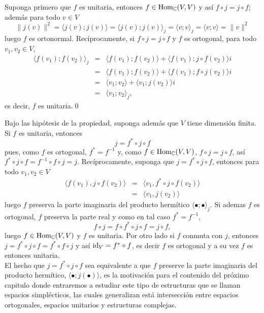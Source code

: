 \dem Suponga primero que $f$ es unitaria, entonces $f\in\operatorname{Hom}_\mathbb{C}(V,V)$ y as\'i $f\circ j=j\circ f$; adem\'as para todo $v\in V$
\[
\|j(v)\|^2=\langle j(v);j(v)\rangle=\langle j(v);j(v)\rangle_j=\langle v;v\rangle_j=\langle v;v\rangle=\|v\|^2
\]
luego $f$ es ortonormal. Rec\'iprocamente, si $f\circ j=j\circ f$ y $f$ es ortogonal, 
para todo $v_1,v_2\in V$,
\begin{eqnarray*}
\langle f(v_1);f(v_2)\rangle_j & = & \langle f(v_1);f(v_2)\rangle+\langle f(v_1);j\circ f(v_2)\rangle i\\
 & = & \langle f(v_1);f(v_2)\rangle+\langle f(v_1);f\circ j(v_2)\rangle i\\
 & = & \langle v_1;v_2\rangle+\langle v_1;j(v_2)\rangle i\\
 & = & \langle v_1;v_2\rangle_j,
\end{eqnarray*}
es decir, $f$ es unitaria.\qed

\begin{obs}
Bajo las hip\'otesis de la propiedad, suponga adem\'as que $V$ tiene dimensi\'on finita. Si $f$ es unitaria, entonces
\[
j=f^*\circ j \circ f
\]
pues, como $f$ es ortogonal, $f^*=f^{-1}$ y, como $f\in\operatorname{Hom}_{\mathbb{C}}(V,V)$, $f\circ j=j\circ f$, as\'i $f^*\circ j \circ f=f^{-1}\circ f\circ j=j$. Rec\'iprocamente,
suponga que $j=f^*\circ j \circ f$, entonces para todo $v_1,v_2\in V$
\begin{eqnarray*}
\langle f(v_1),j\circ f(v_2)\rangle & = & \langle v_1,f^*\circ j\circ f(v_2)\rangle\\
  & = & \langle v_1,j(v_2)\rangle
\end{eqnarray*}
luego $f$ preserva la parte imaginaria del producto herm\'itico $\langle\bullet;\bullet\rangle_j$. Si ademas $f$ es ortogonal, $f$ preserva la parte real y como en tal caso $f^*=f^{-1}$,
\[
f\circ j=f\circ f^*\circ j\circ f=j\circ f,
\]
luego $f\in\operatorname{Hom}_{\mathbb{C}}(V,V)$ y $f$ es unitaria. Por otro lado si $f$ conmuta con $j$, entonces $j=f^*\circ j \circ f=f^*\circ f\circ j$ y as\'i $\operatorname{id}_V=f^*\circ f$, es decir $f$ es ortogonal y a su vez $f$ es entonces unitaria.\\
El hecho que $j=f^*\circ j\circ f$ sea equivalente a que $f$ preserve la parte imaginaria del producto herm\'itico, $\langle\bullet;j(\bullet)\rangle$, es la motivaci\'on para el contenido del pr\'oximo capitulo donde entraremos a estudiar este tipo de estructuras que se llaman espacios simpl\'ecticos, las cuales generalizan est\'a intersecci\'on entre espacios ortogonales, espacios unitarios y estructuras complejas.
\end{obs} 
